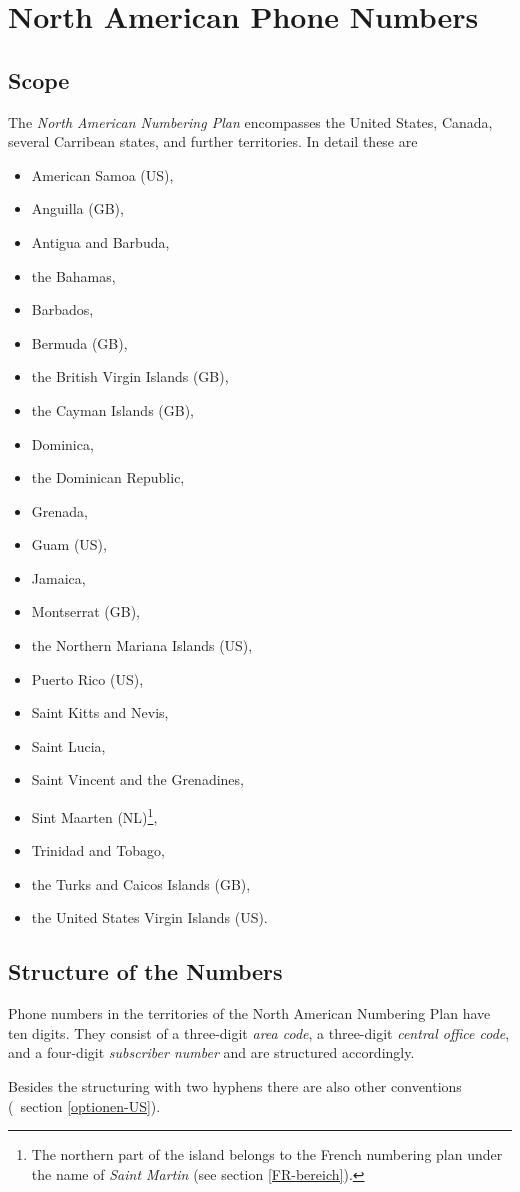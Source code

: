 \documentclass[numbers=noenddot]{scrreprt}
\newcommand\Abschnittsliteratur[1]{\bgroup
\small
\raggedright
\printbibliography[heading=subbibnumbered,keyword=#1]
\egroup}
\newcommand\UeberschriftGeltungsbereich{\section{Scope}}
\newcommand\UeberschriftAufbau{\section{Structure of the Numbers}}
\newcommand*\vglAbschnitt[1]{(\cf\ section \ref{#1})}
\newcommand*\sieheAbschnitt[1]{(see section \ref{#1})}
\begin{document}
\Abschnittsliteratur{british}

\chapter{North American Phone Numbers} \label{US}
\UeberschriftGeltungsbereich \label{US-bereich}
The \emph{North American Numbering Plan}
\cite{wikipedia-NANP}
encompasses the United States, Canada, several Carribean states, and further territories. In detail these are
\begin{itemize}
\item American Samoa (US),
\item Anguilla (GB),
\item Antigua and Barbuda,
\item the Bahamas,
\item Barbados,
\item Bermuda (GB),
\item the British Virgin Islands (GB),
\item the Cayman Islands (GB),
\item Dominica,
\item the Dominican Republic,
\item Grenada,
\item Guam (US),
\item Jamaica,
\item Montserrat (GB),
\item the Northern Mariana Islands (US),
\item Puerto Rico (US),
\item Saint Kitts and Nevis,
\item Saint Lucia,
\item Saint Vincent and the Grenadines,
\item Sint Maarten (NL)\footnote{The northern part of the island belongs to the French numbering plan under the name of \emph{Saint Martin}
\sieheAbschnitt{FR-bereich}.},
\item Trinidad and Tobago,
\item the Turks and Caicos Islands (GB),
\item the United States Virgin Islands (US).
\end{itemize}

\UeberschriftAufbau
Phone numbers in the territories of the North American Numbering Plan have ten digits. They consist of a three-digit \emph{area code}, a three-digit \emph{central office code}, and a four-digit \emph{subscriber number} and are structured accordingly.
\begin{sidebyside}
\end{sidebyside}
Besides the structuring with two hyphens there are also other conventions
\vglAbschnitt{optionen-US}.
\end{document}

